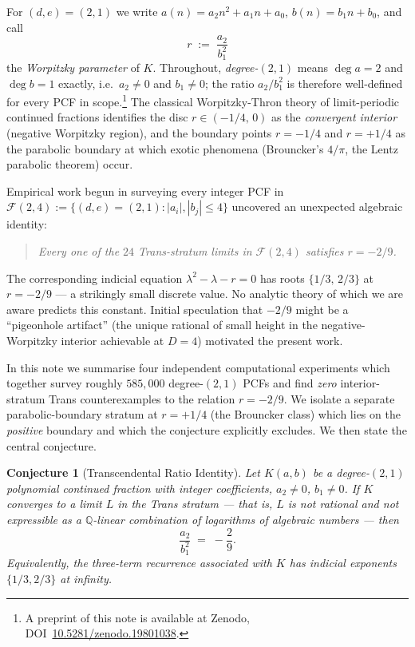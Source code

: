 \documentclass[11pt]{amsart}
\newtheorem{conjecture}[theorem]{Conjecture}
\theoremstyle{definition}
\theoremstyle{remark}
\newcommand{\FF}{\mathcal{F}}
\begin{document}
For $(d,e) = (2,1)$ we write $a(n) = a_2 n^2 + a_1 n + a_0$,
$b(n) = b_1 n + b_0$, and call
\begin{equation}\label{eq:r-defn}
  r \;:=\; \frac{a_2}{b_1^2}
\end{equation}
the \emph{Worpitzky parameter} of $K$.  Throughout, \emph{degree-$(2,1)$}
means $\deg a = 2$ and $\deg b = 1$ exactly, i.e.\ $a_2 \neq 0$ and
$b_1 \neq 0$; the ratio $a_2/b_1^2$ is therefore well-defined for
every PCF in scope.\footnote{A preprint of this note is available at
Zenodo, DOI~\href{https://doi.org/10.5281/zenodo.19801038}{10.5281/zenodo.19801038}.}  The classical Worpitzky-Thron
theory of limit-periodic continued fractions identifies the disc
$r \in (-1/4,\,0)$ as the \emph{convergent interior} (negative
Worpitzky region), and the boundary points $r = -1/4$ and $r = +1/4$
as the parabolic boundary at which exotic phenomena (Brouncker's
$4/\pi$, the Lentz parabolic theorem) occur.

Empirical work begun in \cite{PCF25} surveying every integer PCF in
$\FF(2,4) := \{(d,e)=(2,1) : |a_i|, |b_j| \le 4\}$ uncovered an
unexpected algebraic identity:
\begin{quote}
\itshape Every one of the $24$ Trans-stratum limits in $\FF(2,4)$
satisfies $r = -2/9$.
\end{quote}
The corresponding indicial equation $\lambda^2 - \lambda - r = 0$
has roots $\{1/3,\,2/3\}$ at $r = -2/9$ --- a strikingly small
discrete value.  No analytic theory of which we are aware predicts
this constant.  Initial speculation that $-2/9$ might be a
``pigeonhole artifact'' (the unique rational of small height in the
negative-Worpitzky interior achievable at $D = 4$) motivated the
present work.

In this note we summarise four independent computational experiments
which together survey roughly $585{,}000$ degree-$(2,1)$ PCFs and
find \emph{zero} interior-stratum Trans counterexamples to the
relation $r = -2/9$.  We isolate a separate parabolic-boundary stratum at
$r = +1/4$ (the Brouncker class) which lies on the \emph{positive}
boundary and which the conjecture explicitly excludes.  We then
state the central conjecture.

\begin{conjecture}[Transcendental Ratio Identity]\label{conj:tri}
Let $K(a, b)$ be a degree-$(2,1)$ polynomial continued fraction with
integer coefficients, $a_2 \ne 0$, $b_1 \ne 0$.  If $K$ converges to
a limit $L$ in the Trans stratum --- that is, $L$ is not rational and
not expressible as a $\mathbb Q$-linear combination of logarithms of
algebraic numbers --- then
\begin{equation}\label{eq:conj}
  \frac{a_2}{b_1^2} \;=\; -\frac{2}{9}.
\end{equation}
Equivalently, the three-term recurrence associated with $K$ has
indicial exponents $\{1/3, 2/3\}$ at infinity.
\end{conjecture}
\end{document}
